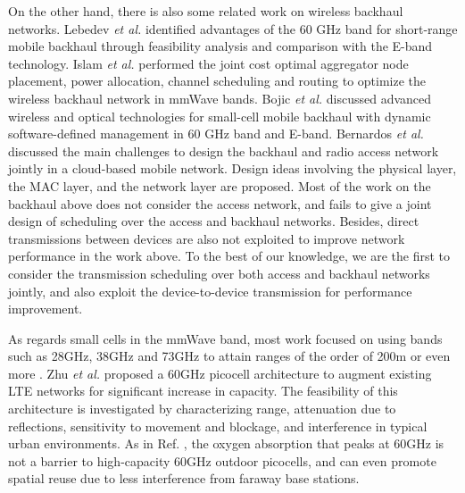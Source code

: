 \documentclass[journal]{IEEEtran}
\begin{document}
On the other hand, there is also some related work on wireless backhaul networks. Lebedev \emph{et
al.} \cite{60GHz-backhaul-1} identified advantages of the 60 GHz band for short-range mobile
backhaul through feasibility analysis and comparison with the E-band technology. Islam \emph{et
al.} \cite{60GHz-backhaul-2} performed the joint cost optimal aggregator node placement, power
allocation, channel scheduling and routing to optimize the wireless backhaul network in mmWave
bands. Bojic \emph{et al.} \cite{60GHz-backhaul-4} discussed advanced wireless and optical
technologies for small-cell mobile backhaul with dynamic software-defined management in 60 GHz band
and E-band. Bernardos \emph{et al.} \cite{joint_design} discussed the main challenges to design the
backhaul and radio access network jointly in a cloud-based mobile network. Design ideas involving
the physical layer, the MAC layer, and the network layer are proposed. Most of the work on the
backhaul above does not consider the access network, and fails to give a joint design of scheduling
over the access and backhaul networks. Besides, direct transmissions between devices are also not
exploited to improve network performance in the work above. To the best of our knowledge, we are
the first to consider the transmission scheduling over both access and backhaul networks jointly,
and also exploit the device-to-device transmission for performance improvement.



As regards small cells in the mmWave band, most work focused on using bands such as 28GHz, 38GHz
and 73GHz to attain ranges of the order of 200m or even more \cite{mmW-cellular,Sarnoff}. Zhu
\emph{et al.} \cite{Pico_60GHz} proposed a 60GHz picocell architecture to augment existing LTE
networks for significant increase in capacity. The feasibility of this architecture is investigated
by characterizing range, attenuation due to reflections, sensitivity to movement and blockage, and
interference in typical urban environments. As in Ref. \cite{Pico_60GHz}, the oxygen absorption
that peaks at 60GHz is not a barrier to high-capacity 60GHz outdoor picocells, and can even promote
spatial reuse due to less interference from faraway base stations.
\end{document}
